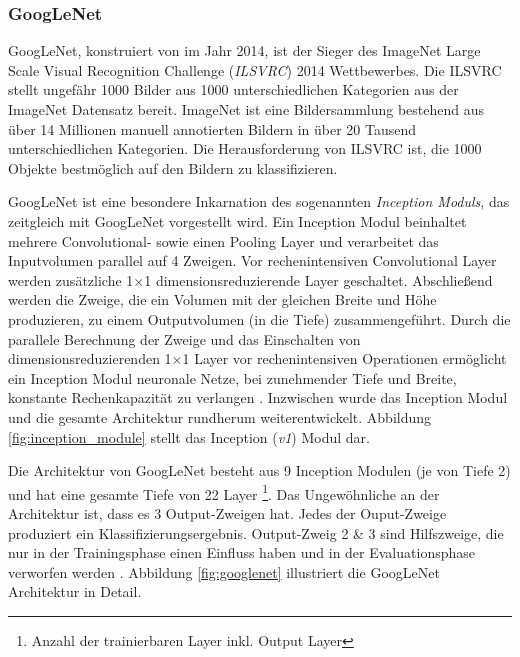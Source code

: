 \subsubsection{GoogLeNet}
\label{sec:googlenet}
GoogLeNet, konstruiert von \citet{szegedyGoingDeeperConvolutions2015} im Jahr 2014, ist der Sieger des ImageNet Large Scale Visual Recognition Challenge (\textit{ILSVRC}) 2014 Wettbewerbes. Die ILSVRC stellt ungefähr 1000 Bilder aus 1000 unterschiedlichen Kategorien aus der ImageNet Datensatz bereit. ImageNet ist eine Bildersammlung bestehend aus über 14 Millionen manuell annotierten Bildern in über 20 Tausend unterschiedlichen Kategorien. Die Herausforderung von ILSVRC ist, die 1000 Objekte bestmöglich auf den Bildern zu klassifizieren.

GoogLeNet ist eine besondere Inkarnation des sogenannten\textit{ Inception Moduls}, das zeitgleich mit GoogLeNet vorgestellt wird.
Ein Inception Modul beinhaltet mehrere Convolutional- sowie einen Pooling Layer und verarbeitet das Inputvolumen parallel auf 4 Zweigen. Vor rechenintensiven Convolutional Layer werden zusätzliche 1$\times$1 dimensionsreduzierende Layer geschaltet. Abschließend werden die Zweige, die ein Volumen mit der gleichen Breite und Höhe produzieren, zu einem Outputvolumen (in die Tiefe) zusammengeführt.  Durch die parallele Berechnung der Zweige und das Einschalten von dimensionsreduzierenden 1$\times$1 Layer vor rechenintensiven Operationen ermöglicht ein Inception Modul neuronale Netze, bei zunehmender Tiefe und Breite, konstante Rechenkapazität zu verlangen \cite{szegedyGoingDeeperConvolutions2015}.
Inzwischen wurde das Inception Modul \cite{szegedyRethinkingInceptionArchitecture2016} und die gesamte Architektur rundherum \cite{szegedyInceptionv4InceptionResNetImpact2016} weiterentwickelt. Abbildung \ref{fig:inception_module} stellt das Inception (\textit{v1}) Modul dar.

Die Architektur von GoogLeNet besteht aus 9 Inception Modulen (je von Tiefe 2) und hat eine gesamte Tiefe von 22 Layer \footnote{Anzahl der trainierbaren Layer inkl. Output Layer}. Das Ungewöhnliche an der Architektur ist, dass es 3 Output-Zweigen hat. Jedes der Ouput-Zweige produziert ein Klassifizierungsergebnis. Output-Zweig 2 \& 3 sind Hilfszweige, die nur in der Trainingsphase einen Einfluss haben und in der Evaluationsphase verworfen werden \cite{szegedyGoingDeeperConvolutions2015}. Abbildung \ref{fig:googlenet} illustriert die GoogLeNet Architektur in Detail.

